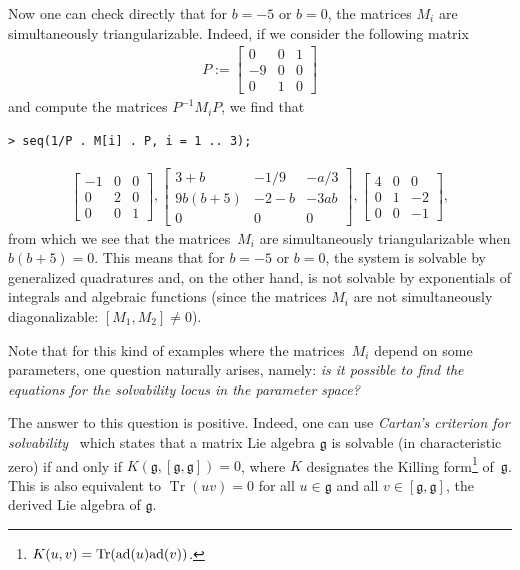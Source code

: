 \documentclass[pdftex]{sigma}
\numberwithin{equation}{section}
\begin{document}
\begin{Example}
Now one can check directly that for
$b=-5$ or $b=0$, the matrices $M_i$ are simultaneously triangularizable.
Indeed, if we consider the following matrix
\begin{gather*}
P:= \left[ \begin{matrix} 0&0&1\\ -9&0&0
\\ 0&1&0\end{matrix} \right]
\end{gather*}
and compute the matrices $P^{-1}M_iP$, we find that
\begin{verbatim}
> seq(1/P . M[i] . P, i = 1 .. 3);
\end{verbatim}
\begin{gather*}
\left[ \begin{matrix} -1&0&0\\ 0&2&0
\\ 0&0&1\end{matrix} \right],
\left[ \begin{matrix} 3+b&-1/9&-a/3\\ 9 b
 ( b+5 ) &-2-b&-3 ab\\ 0&0&0\end{matrix}
\right],
\left[ \begin{matrix} 4&0&0\\ 0&1&-2
\\ 0&0&-1\end{matrix} \right],
\end{gather*}
from which we see that the matrices~$M_i$ are simultaneously triangularizable when $b(b+5)=0$. This means that for $b=-5$ or $b=0$, the system is solvable by generalized quadratures and, on the other hand, is not solvable by exponentials of integrals and algebraic functions (since the matrices $M_i$ are not simultaneously diagonalizable: $[M_1,M_2]\ne0$).
\end{Example}

Note that for this kind of examples where the matrices~$M_i$ depend on some parameters, one question naturally arises, namely: {\it is it possible to find the equations for the solvability locus in the parameter space?}

The answer to this question is positive. Indeed, one can use {\em Cartan's criterion for solvabi\-li\-ty}~\cite{Hu72} which states that a matrix Lie algebra $\mathfrak{g}$ is solvable (in characteristic zero) if and only if $K(\mathfrak{g}, [\mathfrak{g},\mathfrak{g}]) =0$, where $K$ designates the Killing form\footnote{$K(u,v)=\operatorname{Tr}({\rm ad}(u){\rm ad}(v))$.} of~$\mathfrak{g}$. This is also equivalent to $\operatorname{Tr}(uv)=0$ for all $u \in \mathfrak{g}$ and all $v \in [\mathfrak{g},\mathfrak{g}]$, the derived Lie algebra of $\mathfrak{g}$.
\end{document}

